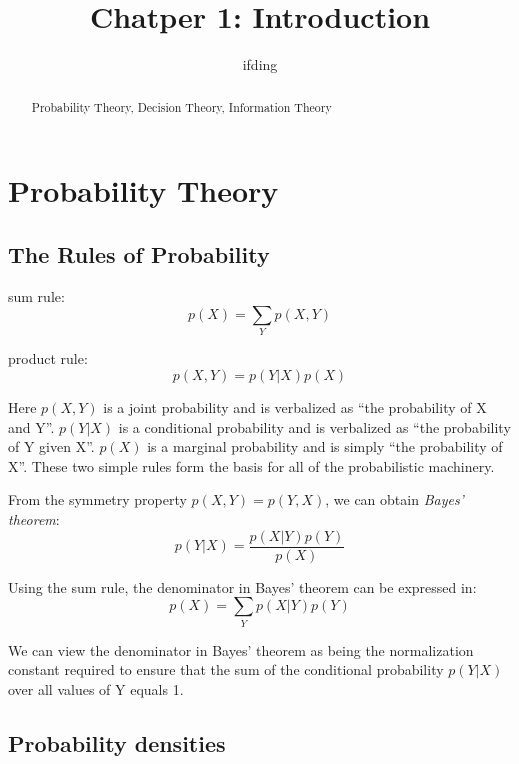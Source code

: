 \documentclass[5p,sort&compress]{elsarticle}
\begin{document}
\begin{frontmatter}
    \title{Chatper 1: Introduction}
    \author{ifding}
    
    \begin{abstract}
        Probability Theory, Decision Theory, Information Theory
    \end{abstract}


\end{frontmatter}



\section{Probability Theory}

\subsection{The Rules of Probability} 

sum rule:
\begin{equation}
p(X)=\sum_{Y} p(X, Y)
\end{equation}

product rule:
\begin{equation}
p(X, Y)=p(Y | X) p(X)
\end{equation}

Here $p(X,Y)$ is a joint probability and is verbalized as ``the probability of X and Y''. $p(Y|X)$ is a conditional probability and is verbalized as ``the probability of Y given X''. $p(X)$ is a marginal probability and is simply ``the probability of X''. These two simple rules form the basis for all of the probabilistic machinery.

From the symmetry property $p(X, Y)=p(Y, X)$, we can obtain \textit{Bayes' theorem}:
\begin{equation}
p(Y | X)=\frac{p(X | Y) p(Y)}{p(X)}
\end{equation}

Using the sum rule, the denominator in Bayes' theorem can be expressed in:
\begin{equation}
p(X)=\sum_{Y} p(X | Y) p(Y)
\end{equation}

We can view the denominator in Bayes' theorem as being the normalization constant required to ensure that the sum of the conditional probability $p(Y|X)$ over all values of Y equals 1.


\subsection{Probability densities} 
\end{document}
